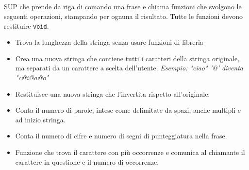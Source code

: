 \documentclass{article}
\begin{document}
\subsection{}
SUP che prende da riga di comando una frase e chiama funzioni che svolgono le seguenti operazioni, stampando per ognuna il risultato. Tutte le funzioni devono restituire \texttt{void}.
\begin{itemize}
	\item Trova la lunghezza della stringa senza usare funzioni di libreria
	\item Crea una nuova stringa che contiene tutti i caratteri della stringa originale, ma separati da un carattere a scelta dell'utente. \textit{Esempio: "ciao" '@' diventa "c@i@a@o"}
	\item Restituisce una nuova stringa che l'invertita rispetto all'originale.
	\item Conta il numero di parole, intese come delimitate da spazi, anche multipli e ad inizio stringa.
	\item Conta il numero di cifre e numero di segni di punteggiatura nella frase. 
	\item Funzione che trova il carattere con più occorrenze e comunica al chiamante il carattere in questione e il numero di occorrenze. 
\end{itemize}



\end{document}

